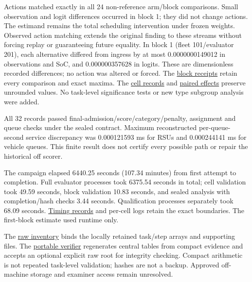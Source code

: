 \documentclass[11pt,a4paper]{article}
\begin{document}
Actions matched exactly in all 24 non-reference arm/block comparisons. Small observation and logit differences occurred in block 1; they did not change actions. The estimand remains the total scheduling intervention under frozen weights. Observed action matching extends the original finding to these streams without forcing replay or guaranteeing future equality. In block 1 (fleet 101/evaluator 201), each alternative differed from ingress by at most 0.0000000149012 in observations and SoC, and 0.000000357628 in logits. These are dimensionless recorded differences; no action was altered or forced. The \href{\detokenize{../joint_confirmation_2026-09-08/evidence/BLOCK_CONTROLS.json}}{block receipts} retain every comparison and exact maxima. The \href{\detokenize{../joint_confirmation_2026-09-08/evidence/CELL_RESULTS.json}}{cell records} and \href{\detokenize{../joint_confirmation_2026-09-08/evidence/PAIRED_EFFECTS.csv}}{paired effects} preserve unrounded values. No task-level significance tests or new type subgroup analysis were added.

All 32 records passed final-admission/score/category/penalty, assignment and queue checks under the sealed contract. Maximum reconstructed per-queue-second service discrepancy was 0.000121593 ms for RSUs and 0.000244141 ms for vehicle queues. This finite result does not certify every possible path or repair the historical off scorer.

The campaign elapsed 6440.25 seconds (107.34 minutes) from first attempt to completion. Full evaluator processes took 6375.54 seconds in total; cell validation took 49.59 seconds, block validation 10.83 seconds, and sealed analysis with completion/hash checks 3.44 seconds. Qualification processes separately took 68.09 seconds. \href{\detokenize{../joint_confirmation_2026-09-08/evidence/TIMING.json}}{Timing records} and per-cell logs retain the exact boundaries. The first-block estimate used runtime only.

The \href{\detokenize{../joint_confirmation_2026-09-08/evidence/RAW_INVENTORY.json}}{raw inventory} binds the locally retained task/step arrays and supporting files. The \href{\detokenize{../joint_confirmation_2026-09-08/document/verify_results.py}}{portable verifier} regenerates central tables from compact evidence and accepts an optional explicit raw root for integrity checking. Compact arithmetic is not repeated task-level validation; hashes are not a backup. Approved off-machine storage and examiner access remain unresolved.
\end{document}
